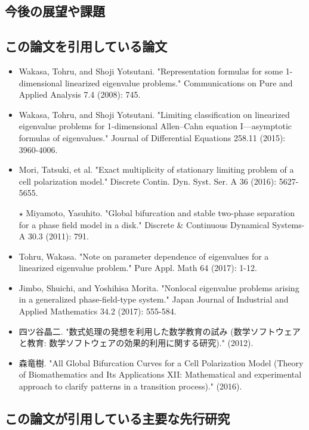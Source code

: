 \documentclass[openary, a4paper, oneside]{jsarticle}
\begin{document}
	\subsection{今後の展望や課題}

	\subsection{この論文を引用している論文}
		\begin{itemize}
			\item Wakasa, Tohru, and Shoji Yotsutani. "Representation formulas for some 1-dimensional linearized eigenvalue problems." Communications on Pure and Applied Analysis 7.4 (2008): 745.
			\item Wakasa, Tohru, and Shoji Yotsutani. "Limiting classification on linearized eigenvalue problems for 1-dimensional Allen–Cahn equation I—asymptotic formulas of eigenvalues." Journal of Differential Equations 258.11 (2015): 3960-4006.
			\item Mori, Tatsuki, et al. "Exact multiplicity of stationary limiting problem of a cell polarization model." Discrete Contin. Dyn. Syst. Ser. A 36 (2016): 5627-5655.
			\item[$\star$] Miyamoto, Yasuhito. "Global bifurcation and stable two-phase separation for a phase field model in a disk." Discrete \& Continuous Dynamical Systems-A 30.3 (2011): 791.
			\item Tohru, Wakasa. "Note on parameter dependence of eigenvalues for a linearized eigenvalue problem." Pure Appl. Math 64 (2017): 1-12.
			\item Jimbo, Shuichi, and Yoshihisa Morita. "Nonlocal eigenvalue problems arising in a generalized phase-field-type system." Japan Journal of Industrial and Applied Mathematics 34.2 (2017): 555-584.
			\item 四ツ谷晶二. "数式処理の発想を利用した数学教育の試み (数学ソフトウェアと教育: 数学ソフトウェアの効果的利用に関する研究)." (2012).
			\item 森竜樹. "All Global Bifurcation Curves for a Cell Polarization Model (Theory of Biomathematics and Its Applications XII: Mathematical and experimental approach to clarify patterns in a transition process)." (2016).
		\end{itemize}

	\subsection{この論文が引用している主要な先行研究}
\end{document}
